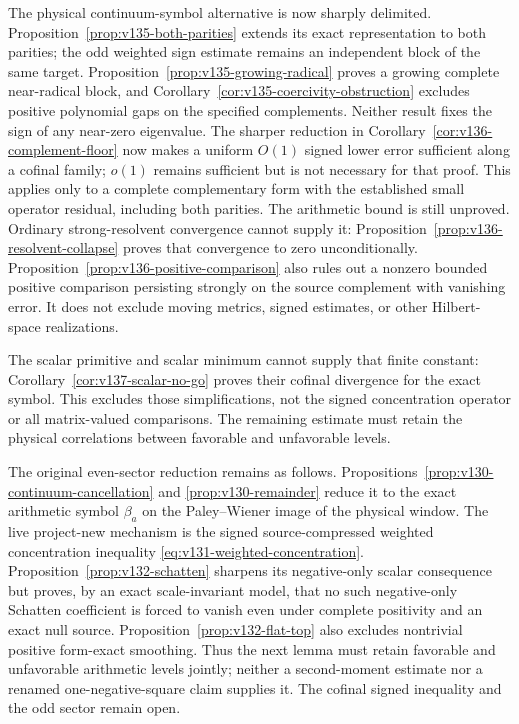 \documentclass[11pt]{article}
\theoremstyle{remark}
\begin{document}
The physical continuum-symbol alternative is now sharply delimited.
Proposition~\ref{prop:v135-both-parities} extends its exact representation
to both parities; the odd weighted sign estimate remains an independent
block of the same target.  Proposition~\ref{prop:v135-growing-radical}
proves a growing complete near-radical block, and
Corollary~\ref{cor:v135-coercivity-obstruction} excludes positive
polynomial gaps on the specified complements.  Neither result fixes the
sign of any near-zero eigenvalue.
The sharper reduction in Corollary~\ref{cor:v136-complement-floor}
now makes a uniform $O(1)$ signed lower error sufficient along a cofinal
family; $o(1)$ remains sufficient but is not necessary for that proof.
This applies only to a complete complementary form with the established
small operator residual, including both parities. The arithmetic bound
is still unproved. Ordinary strong-resolvent convergence cannot supply it:
Proposition~\ref{prop:v136-resolvent-collapse} proves that convergence to
zero unconditionally. Proposition~\ref{prop:v136-positive-comparison}
also rules out a nonzero bounded positive comparison persisting strongly
on the source complement with vanishing error. It does not exclude
moving metrics, signed estimates, or other Hilbert-space realizations.

The scalar primitive and scalar minimum cannot supply that finite
constant: Corollary~\ref{cor:v137-scalar-no-go} proves their cofinal
divergence for the exact symbol. This excludes those simplifications,
not the signed concentration operator or all matrix-valued comparisons.
The remaining estimate must retain the physical correlations between
favorable and unfavorable levels.

The original even-sector reduction remains as follows.
Propositions~\ref{prop:v130-continuum-cancellation} and
\ref{prop:v130-remainder} reduce it to the exact arithmetic symbol
$\beta_a$ on the Paley--Wiener image of the physical window. The live
project-new mechanism is the signed source-compressed weighted
concentration inequality \eqref{eq:v131-weighted-concentration}.
Proposition~\ref{prop:v132-schatten} sharpens its negative-only scalar
consequence but proves, by an exact scale-invariant model, that no such
negative-only Schatten coefficient is forced to vanish even under
complete positivity and an exact null source.
Proposition~\ref{prop:v132-flat-top}
also excludes nontrivial positive form-exact smoothing. Thus the next
lemma must retain favorable and unfavorable arithmetic levels jointly;
neither a second-moment estimate nor a renamed one-negative-square
claim supplies it. The cofinal signed inequality and the odd sector
remain open.
\end{document}
